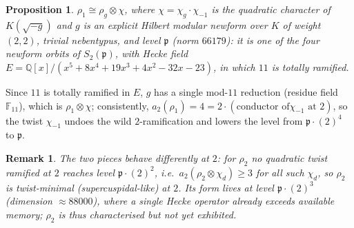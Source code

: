 \documentclass[11pt]{article}
\newtheorem{proposition}{Proposition}
\newtheorem{remark}{Remark}
\newcommand{\bbF}{\mathbb{F}}
\newcommand{\bbQ}{\mathbb{Q}}
\begin{document}
\begin{proposition}\label{prop:g}
$\rho_1\cong \rho_{g}\otimes\chi$, where $\chi=\chi_g\cdot\chi_{-1}$ is the quadratic character of
$K(\sqrt{-g})$ and $g$ is an explicit Hilbert modular newform over $K$ of weight $(2,2)$, trivial
nebentypus, and level $\mathfrak p$ (norm $66179$): it is one of the four newform orbits of
$S_2(\mathfrak p)$, with Hecke field $E=\bbQ[x]/(x^5+8x^4+19x^3+4x^2-32x-23)$, in which $11$ is
totally ramified.
\end{proposition}

Since $11$ is totally ramified in $E$, $g$ has a single mod-$11$ reduction (residue field
$\bbF_{11}$), which is $\rho_1\otimes\chi$; consistently, $a_2(\rho_1)=4=2\cdot(\text{conductor of
}\chi_{-1}\text{ at }2)$, so the twist $\chi_{-1}$ undoes the wild $2$-ramification and lowers the
level from $\mathfrak p\cdot(2)^4$ to $\mathfrak p$.

\begin{remark}
The two pieces behave differently at $2$: for $\rho_2$ no quadratic twist ramified at $2$ reaches
level $\mathfrak p\cdot(2)^2$, i.e.\ $a_2(\rho_2\otimes\chi_d)\ge 3$ for all such $\chi_d$, so
$\rho_2$ is twist-minimal (supercuspidal-like) at $2$. Its form lives at level $\mathfrak
p\cdot(2)^3$ (dimension $\approx 88000$), where a single Hecke operator already exceeds available
memory; $\rho_2$ is thus characterised but not yet exhibited.
\end{remark}
\end{document}
